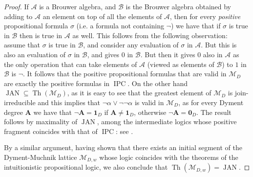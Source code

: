 \documentclass[11pt]{amsart}
\newcommand{\Th}{\operatorname{Th}}
\newcommand{\IPC}{\operatorname{IPC}}
\newcommand{\JAN}{\operatorname{JAN}}
\begin{document}
\begin{proof} 
If $\mathscr{A}$ is a Brouwer algebra, and $\mathscr{B}$ is the Brouwer 
algebra obtained by adding to $\mathscr{A}$ an element on top of all the 
elements of $\mathscr{A}$, then for every \emph{positive} propositional 
formula $\sigma$ (i.e. a formula not containing $\neg$) we have that if 
$\sigma$ is true in $\mathscr{B}$ then is true in $\mathscr{A}$ as well. This 
follows from the following observation: assume that $\sigma$ is true in 
$\mathscr{B}$, and consider any evaluation of $\sigma$ in $\mathscr{A}$. But 
this is also an evaluation of $\sigma$ in $\mathscr{B}$, and gives $0$ in 
$\mathscr{B}$. But then it gives $0$ also in $\mathscr{A}$ as the only 
operation that can take elements of $\mathscr{A}$ (viewed as elements of 
$\mathscr{B}$) to $1$ in $\mathscr{B}$ is $\neg$. It follows that the 
positive propositional formulas that are valid in $\mathscr{M}_{D}$ are 
exactly the positive formulas in $\IPC$. On the other hand $\JAN \subseteq 
\Th(\mathscr{M}_{D})$, as it is easy to see that the greatest element of 
$\mathscr{M}_{D}$ is join-irreducible and this implies that $\neg \alpha \vee 
\neg \neg \alpha$ is valid in $\mathscr{M}_D$, as for every Dyment degree 
$\mathbf{A}$ we have that $\neg \mathbf{A}=\mathbf{1}_{D}$ if $\mathbf{A} \ne 
\mathbf{1}_{D}$, otherwise $\neg \mathbf{A}=\mathbf{0}_{D}$. The result 
follows by maximality of $\JAN$, among the intermediate logics whose positive 
fragment coincides with that of $\IPC$: see \cite{Jankov:Weak}. 

By a similar argument, having shown that there exists an initial segment of 
the Dyment-Muchnik lattice $\mathscr{M}_{D,w}$ whose logic coincides with the 
theorems of the intuitionistic propositional logic, we also conclude that 
$\Th(\mathscr{M}_{D,w})=\JAN$. 
\end{proof} 
\end{document}
